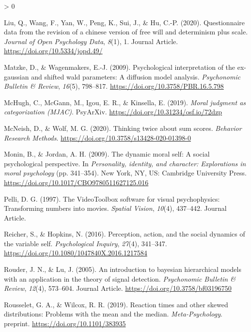 \documentclass[
  english,
  man]{apa6}
\newlength{\cslhangindent}
\newenvironment{CSLReferences}[2] %
 {%
  \setlength{\parindent}{0pt}
  \ifodd #1 \everypar{\setlength{\hangindent}{\cslhangindent}}\ignorespaces\fi
  \ifnum #2 > 0
  \setlength{\parskip}{#2\baselineskip}
  \fi
 }%
 {}
\begin{document}
\begin{CSLReferences}{1}{0}
\leavevmode\hypertarget{ref-Liu_2020_JOPD}{}%
Liu, Q., Wang, F., Yan, W., Peng, K., Sui, J., \& Hu, C.-P. (2020). Questionnaire data from the revision of a chinese version of free will and determinism plus scale. \emph{Journal of Open Psychology Data}, \emph{8}(1), 1. Journal Article. \url{https://doi.org/10.5334/jopd.49/}

\leavevmode\hypertarget{ref-matzke_psychological_2009}{}%
Matzke, D., \& Wagenmakers, E.-J. (2009). Psychological interpretation of the ex-gaussian and shifted wald parameters: A diffusion model analysis. \emph{Psychonomic Bulletin \& Review}, \emph{16}(5), 798--817. \url{https://doi.org/10.3758/PBR.16.5.798}

\leavevmode\hypertarget{ref-mchugh_moral_2019}{}%
McHugh, C., McGann, M., Igou, E. R., \& Kinsella, E. (2019). \emph{Moral judgment as categorization ({MJAC})}. {PsyArXiv}. \url{https://doi.org/10.31234/osf.io/72dzp}

\leavevmode\hypertarget{ref-mcneish_thinking_2020}{}%
McNeish, D., \& Wolf, M. G. (2020). Thinking twice about sum scores. \emph{Behavior Research Methods}. \url{https://doi.org/10.3758/s13428-020-01398-0}

\leavevmode\hypertarget{ref-monin_dynamic_2009}{}%
Monin, B., \& Jordan, A. H. (2009). The dynamic moral self: A social psychological perspective. In \emph{Personality, identity, and character: Explorations in moral psychology} (pp. 341--354). New York, {NY}, {US}: Cambridge University Press. \url{https://doi.org/10.1017/CBO9780511627125.016}

\leavevmode\hypertarget{ref-Pelli_1997}{}%
Pelli, D. G. (1997). The VideoToolbox software for visual psychophysics: Transforming numbers into movies. \emph{Spatial Vision}, \emph{10}(4), 437--442. Journal Article.

\leavevmode\hypertarget{ref-reicher_perception_2016}{}%
Reicher, S., \& Hopkins, N. (2016). Perception, action, and the social dynamics of the variable self. \emph{Psychological Inquiry}, \emph{27}(4), 341--347. \url{https://doi.org/10.1080/1047840X.2016.1217584}

\leavevmode\hypertarget{ref-Rouder_2005_BHM_SDT}{}%
Rouder, J. N., \& Lu, J. (2005). An introduction to bayesian hierarchical models with an application in the theory of signal detection. \emph{Psychonomic Bulletin \& Review}, \emph{12}(4), 573--604. Journal Article. \url{https://doi.org/10.3758/bf03196750}

\leavevmode\hypertarget{ref-Rousselet_2019}{}%
Rousselet, G. A., \& Wilcox, R. R. (2019). Reaction times and other skewed distributions: Problems with the mean and the median. \emph{Meta-Psychology}. preprint. \url{https://doi.org/10.1101/383935}


\end{CSLReferences}
\end{document}

